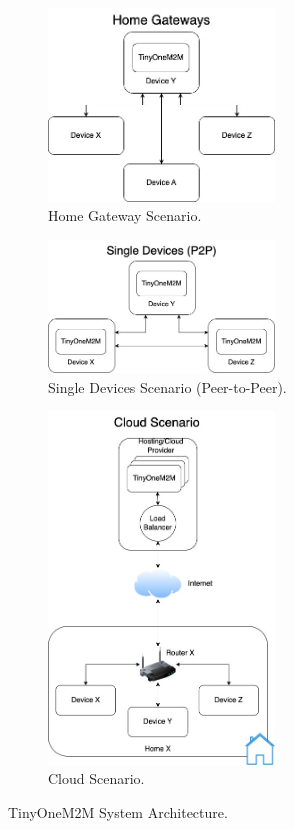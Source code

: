 \documentclass[a4paper,fleqn]{cas-dc}
\begin{document}
\begin{figure}[htb]
     \centering
     \begin{subfigure}[h]{7cm}
         \centering
         \includegraphics[width=6cm]{HomeGatewaysScenario.jpg}
         \caption{Home Gateway Scenario.}
         \label{fig:hgw}
     \end{subfigure}
     \hfill
     \begin{subfigure}[h]{7cm}
         \centering
         \includegraphics[width=6cm]{SingleDevicesScenario.jpg}
         \caption{Single Devices Scenario (Peer-to-Peer).}
         \label{fig:sdc}
     \end{subfigure}
     \hfill
     \begin{subfigure}[h]{7cm}
         \centering
         \includegraphics[width=6cm]{CloudScenario.jpg}
         \caption{Cloud Scenario.}
         \label{fig:cs}
     \end{subfigure}
     \caption{TinyOneM2M System Architecture.}
     \label{fig:scenarios}
\end{figure}
\end{document}
